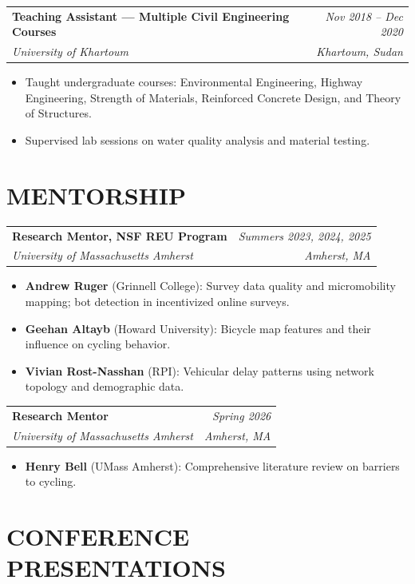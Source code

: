 \documentclass[10pt, a4paper]{article}
\makeatletter
\newcommand{\entry}[4]{%
  \noindent
  \begin{tabularx}{\linewidth}{@{}X@{\hspace{4pt}}r@{}}
    \textbf{#1} & \textit{\small\color{subtle}#2} \\
    \textit{\small\color{subtle}#3} & \textit{\small\color{subtle}#4}
  \end{tabularx}\vspace{2pt}%
}
\makeatother
\begin{document}
\vspace{4pt}
\entry{Teaching Assistant --- Multiple Civil Engineering Courses}{Nov 2018 -- Dec 2020}
      {University of Khartoum}{Khartoum, Sudan}
\begin{itemize}
  \item Taught undergraduate courses: Environmental Engineering, Highway Engineering, Strength of Materials, Reinforced Concrete Design, and Theory of Structures.
  \item Supervised lab sessions on water quality analysis and material testing.
\end{itemize}

\section{MENTORSHIP}

\entry{Research Mentor, NSF REU Program}{Summers 2023, 2024, 2025}
      {University of Massachusetts Amherst}{Amherst, MA}
\begin{itemize}
  \item \textbf{Andrew Ruger} (Grinnell College): Survey data quality and micromobility mapping; bot detection in incentivized online surveys.
  \item \textbf{Geehan Altayb} (Howard University): Bicycle map features and their influence on cycling behavior.
  \item \textbf{Vivian Rost-Nasshan} (RPI): Vehicular delay patterns using network topology and demographic data.
\end{itemize}

\vspace{4pt}
\entry{Research Mentor}{Spring 2026}
      {University of Massachusetts Amherst}{Amherst, MA}
\begin{itemize}
  \item \textbf{Henry Bell} (UMass Amherst): Comprehensive literature review on barriers to cycling.
\end{itemize}

\section{CONFERENCE PRESENTATIONS}
\end{document}
